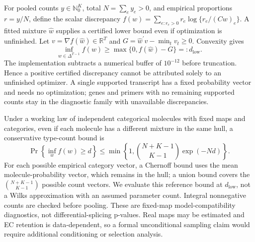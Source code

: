 \documentclass[11pt]{article}
\begin{document}
For pooled counts \(y\in\mathbb N_0^K\), total \(N=\sum_e y_e>0\), and empirical proportions \(r=y/N\), define the scalar discrepancy \(f(w)=\sum_{e:r_e>0}r_e\log\{r_e/(Cw)_e\}\). A fitted mixture \(\widehat w\) supplies a certified lower bound even if optimization is unfinished. Let \(v=\nabla f(\widehat w)\in\mathbb R^T\) and \(G=\widehat w^\prime v-\min_t v_t\ge0\). Convexity gives \begin{equation}\inf_{w\in\Delta^{T-1}}f(w)\ge\max\{0,f(\widehat w)-G\}=:d_{\mathrm{low}}.\end{equation} The implementation subtracts a numerical buffer of \(10^{-12}\) before truncation. Hence a positive certified discrepancy cannot be attributed solely to an unfinished optimizer. A single supported transcript has a fixed probability vector and needs no optimization; genes and primers with no remaining supported counts stay in the diagnostic family with unavailable discrepancies.

Under a working law of independent categorical molecules with fixed maps and categories, even if each molecule has a different mixture in the same hull, a conservative type-count bound is \begin{equation}\Pr\left\{\inf_w f(w)\ge d\right\}\le\min\left\{1,\binom{N+K-1}{K-1}\exp(-Nd)\right\}.\end{equation} For each possible empirical category vector, a Chernoff bound uses the mean molecule-probability vector, which remains in the hull; a union bound covers the \(\binom{N+K-1}{K-1}\) possible count vectors. We evaluate this reference bound at \(d_{\mathrm{low}}\), not a Wilks approximation with an assumed parameter count. Integral nonnegative counts are checked before pooling. These are fixed-map model-compatibility diagnostics, not differential-splicing p-values. Real maps may be estimated and EC retention is data-dependent, so a formal unconditional sampling claim would require additional conditioning or selection analysis.
\end{document}
